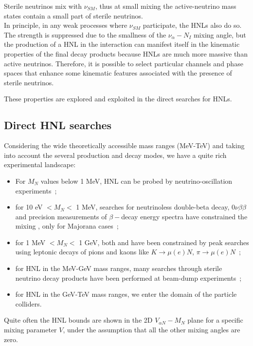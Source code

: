 Sterile neutrinos mix with $\nu_{SM}$, thus at small mixing the
active-neutrino mass states contain a small part of sterile
neutrinos.\\
In principle, in any weak processes where $\nu_{SM}$ participate, the
HNLs also do so. The strength is suppressed due to the smallness of
the $\nu_\alpha - N_I$ mixing angle,
but the production of a HNL in the interaction can manifest itself in the kinematic properties of the final decay products because HNLs are much more massive than active neutrinos.
Therefore, it is possible to select particular channels and phase spaces that enhance some kinematic features associated with the presence of sterile neutrinos.

These properties are explored and exploited in the direct searches for HNLs.



\subsection{Direct HNL searches}\label{sec:c3directHNL}
Considering the wide theoretically accessible mass ranges (MeV-TeV) and taking into account
the several production and decay modes, we have a quite rich
experimental landscape:
\begin{itemize}
\item For $M_N$ values below 1 MeV, HNL can be probed by
  neutrino-oscillation experiments~\cite{de_Gouv_a_2005};
\item for 10 eV $< M_N <$ 1 MeV, searches for neutrinoless double-beta decay,
  $0\nu\beta\beta$ and precision measurements of $\beta-$decay energy
  spectra have constrained the mixing \mixpare, only for Majorana cases~\cite{Deppisch_2015};
\item for 1 MeV $< M_N <$ 1 GeV, both \mixpare and \mixparm have been
  constrained by peak searches using leptonic decays of pions
  and kaons like $K \rightarrow \mu(e) N$, $\pi \rightarrow \mu(e)
  N$~\cite{Liventsev_2013};
\item for HNL in the MeV-GeV mass ranges, many searches through
  sterile neutrino decay products have been performed at beam-dump experiments~\cite{DORENBOSCH1986473};
\item for HNL in the GeV-TeV mass ranges, we enter the domain of
  the particle colliders.
\end{itemize}

Quite often the HNL bounds are shown in the 2D $V_{\alpha N} -
M_N$ plane for a specific mixing parameter $V$, under the assumption that all the other mixing angles are zero. 

